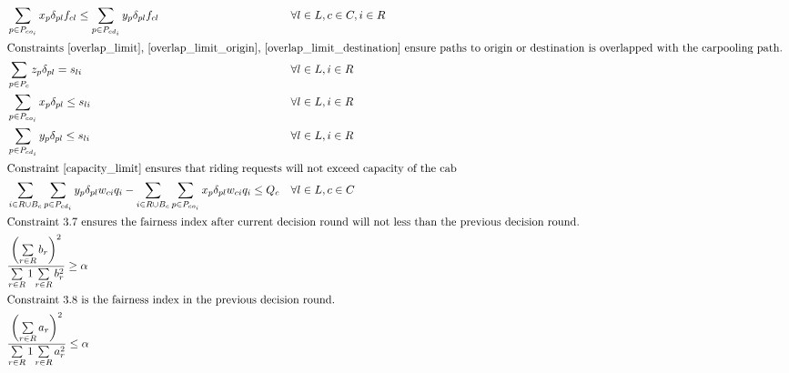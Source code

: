 \begin{align}
  & \sum\limits_{p \in P_{co_i}} x_{p} \delta_{pl} f_{cl} \leq \sum\limits_{p \in P_{cd_i}} y_{p} \delta_{pl} f_{cl} && \forall l \in L, c \in C, i \in R \label{pick_up_drop_off_limit} \\
  \intertext{Constraints \eqref{overlap_limit}, \eqref{overlap_limit_origin}, \eqref{overlap_limit_destination} ensure paths to origin or destination is overlapped with the carpooling path. }
  & \sum\limits_{p \in P_{c}} z_{p} \delta_{pl} = s_{li} && \forall l \in L, i \in R \label{overlap_limit} \\
  & \sum\limits_{p \in P_{co_i}} x_{p} \delta_{pl} \leq s_{li} && \forall l \in L, i \in R \label{overlap_limit_origin} \\
  & \sum\limits_{p \in P_{cd_i}} y_{p} \delta_{pl} \leq s_{li} && \forall l \in L, i \in R \label{overlap_limit_destination} \\
  \intertext{Constraint \eqref{capacity_limit} ensures that riding requests will not exceed capacity of the cab}
  & \sum\limits_{i \in R \cup B_c} \sum\limits_{p \in P_{cd_i}} y_{p} \delta_{pl} w_{ci} q_i - \sum\limits_{i \in R \cup B_c} \sum\limits_{p \in P_{co_i}} x_{p} \delta_{pl} w_{ci} q_i \leq Q_c && \forall l \in L, c \in C \label{capacity_limit} \\
  \intertext{Constraint 3.7 ensures the fairness index after current decision round will not less than the previous decision round.}
  & \frac{\left(\sum\limits_{r \in R} b_r\right)^2}{\sum\limits_{r \in R} 1 \sum\limits_{r \in R} b_r^2} \geq \alpha \\
  \intertext{Constraint 3.8 is the fairness index in the previous decision round.}
  & \frac{\left(\sum\limits_{r \in R} a_r\right)^2}{\sum\limits_{r \in R} 1 \sum\limits_{r \in R} a_r^2} \leq \alpha \\
\end{align}
